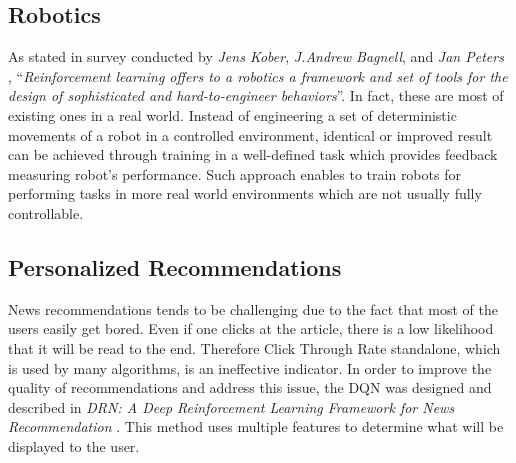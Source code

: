 \subsection{Robotics}
\label{sub:intro-robotics}
As stated in survey conducted by \emph{Jens Kober}, \emph{J.Andrew Bagnell}, and \emph{Jan Peters} \cite{RNSurvey}, ``\emph{Reinforcement
learning offers to a robotics a framework and set of tools for the design of sophisticated and hard-to-engineer behaviors}''. In fact, these
are most of existing ones in a real world. Instead of engineering a set of deterministic movements of a robot in a controlled environment,
identical or improved result can be achieved through training in a well-defined task which provides feedback measuring robot's performance.
Such approach enables to train robots for performing tasks in more real world environments which are not usually fully controllable.

\subsection{Personalized Recommendations}
\label{sub:intro-personalized-reccomendations}
News recommendations tends to be challenging due to the fact that most of the users easily get bored. Even if one clicks at the article,
there is a low likelihood that it will be read to the end. Therefore Click Through Rate standalone, which is used by many algorithms, is an
ineffective indicator. In order to improve the quality of recommendations and address this issue, the DQN was designed and described in
\emph{DRN: A Deep Reinforcement Learning Framework for News Recommendation} \cite{DRNNewsRecommendaiton}. This method uses multiple features
to determine what will be displayed to the user.
